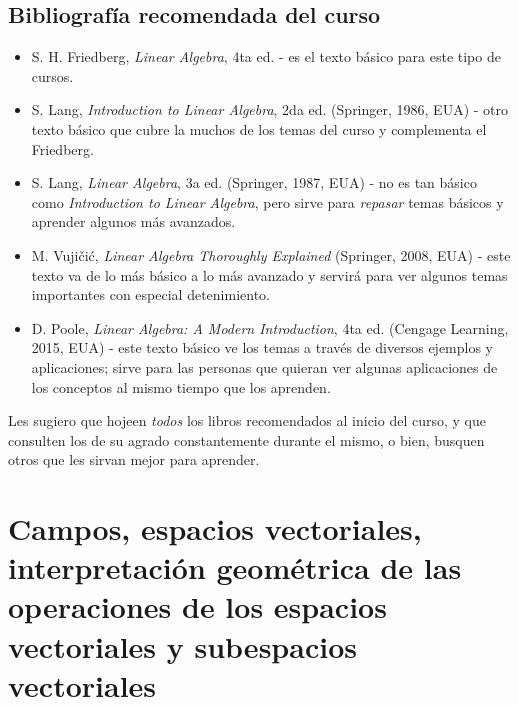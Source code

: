 \documentclass[12pt]{article}
\begin{document}
\subsection{Bibliografía recomendada del curso} \label{Bibliografía}

\begin{itemize}
    \item S. H. Friedberg, \textit{Linear Algebra}, 4ta ed. - es el texto básico para este tipo de cursos.
    \item S. Lang, \textit{Introduction to Linear Algebra}, 2da ed. (Springer, 1986, EUA) - otro texto básico que cubre la muchos de los temas del curso y complementa el Friedberg.
    \item S. Lang, \textit{Linear Algebra}, 3a ed. (Springer, 1987, EUA) - no es tan básico como \textit{Introduction to Linear Algebra}, pero sirve para \textit{repasar} temas básicos y aprender algunos más avanzados.
    \item M. Vujičić, \textit{Linear Algebra Thoroughly Explained} (Springer, 2008, EUA) - este texto va de lo más básico a lo más avanzado y servirá para ver algunos temas importantes con especial detenimiento.
    \item D. Poole, \textit{Linear Algebra: A Modern Introduction}, 4ta ed. (Cengage Learning, 2015, EUA) - este texto básico ve los temas a través de diversos ejemplos y aplicaciones; sirve para las personas que quieran ver algunas aplicaciones de los conceptos al mismo tiempo que los aprenden.
\end{itemize}{}

Les sugiero que hojeen \textit{todos} los libros recomendados al inicio del curso, y que consulten los de su agrado constantemente durante el mismo, o bien, busquen otros que les sirvan mejor para aprender.


\newpage
\section{Campos, espacios vectoriales, interpretación geométrica de las operaciones de los espacios vectoriales y subespacios vectoriales}

\vspace{1cm}
\end{document}
